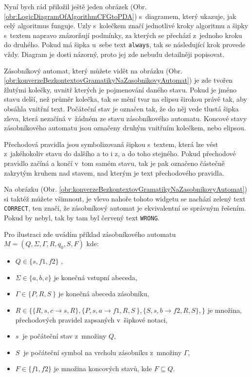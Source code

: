 Nyní bych rád přiložil ještě jeden obrázek (Obr. \ref{obr:LogicDiagramOfAlgorithmCFGtoPDA}) s~diagramem, který ukazuje, jak celý algoritmus funguje. Uzly s~kolečkem značí jednotlivé kroky algoritmu a šipky s~textem napravo znázorňují podmínky, za kterých se přechází z~jednoho kroku do druhého. Pokud má šipka u~sebe text \texttt{always}, tak se následující krok provede vždy. Diagram je dosti názorný, proto jej zde nebudu detailněji popisovat.



Zásobníkový automat, který můžete vidět na obrázku (Obr. \ref{obr:konverzeBezkontextovGramatikyNaZasobnikovyAutomat}) je zde tvořen žlutými kolečky, uvnitř kterých je pojmenování daného stavu. Pokud je jméno stavu delší, než průměr kolečka, tak se mění tvar na elipsu širokou právě tak, aby obsáhla vnitřní text. Počáteční stav je označen tak, že do něj vede tlustá šipka zleva, která nezačíná v~žádném ze stavu zásobníkového automatu. Koncové stavy zásobníkového automatu jsou označeny druhým vnitřním kolečkem, nebo elipsou.

Přechodová pravidla jsou symbolizovaná šipkou s~textem, která lze vést z~jakéhokoliv stavu do dalšího a to i z, a do toho stejného. Pokud přechodové pravidlo začíná a končí v~tom samém stavu, tak je pak označeno částečně zakrytým kruhem nad stavem, nad kterým je text přechodového pravidla. 

Na obrázku (Obr. \ref{obr:konverzeBezkontextovGramatikyNaZasobnikovyAutomat}) si taktéž můžete všimnout, je vlevo nahoře tohoto widgetu se nachází zelený text \texttt{CORRECT}, ten značí, že zásobníkový automat je ekvivalentní se správným řešením. Pokud by nebyl, tak by tam byl červený text \texttt{WRONG}. 

Pro ilustraci zde uvádím příklad zásobníkového automatu \( M = (Q, \Sigma, \Gamma, R, q_0, S, F) \) kde:
\begin{itemize}
\item \( Q \in \{ s, f1, f2 \} \) ,
\item \( \Sigma \in \{ a, b, c \} \) je konečná vstupní abeceda,
\item \( \Gamma \in \{ P, R, S~\} \) je konečná abeceda zásobníku,
\item \( R \in \{ \{ R, s, c \rightarrow s, R \}, \{ P,s,a \rightarrow f1, R, S~\}, \{ S, s, b \rightarrow f2, R, S\}, \} \) je množina, přechodových pravidel zapsaných v~šipkové notaci,
\item \( s~\) je počáteční stav z~množiny \( Q \),
\item \( S~\) je počáteční symbol na vrcholu zásobníku z~množiny \( \Gamma \),
\item \( F \in \{ f1, f2\} \) je množina koncových stavů, kde \( F \subseteq Q \).
\end{itemize}

